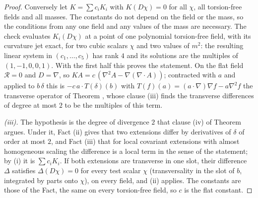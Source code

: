 \begin{proof}
Conversely let $K = \sum c_{i}K_{i}$ with $K(D\chi) = 0$ for all $\chi$, all torsion-free fields and all masses. The constants do not depend on the field or the mass, so the conditions from any one field and any values of the mass are necessary. The check evaluates $K_{i}(D\chi)$ at a point of one polynomial torsion-free field, with its curvature jet exact, for two cubic scalars $\chi$ and two values of $m^{2}$: the resulting linear system in $(c_{1}, \dots, c_{5})$ has rank $4$ and its solutions are the multiples of $(1, -1, 0, 0, 1)$. With the first half this proves the statement. On the flat field $\mathcal{R} = 0$ and $D = \nabla$, so $K A = c\,(\nabla^{2}A - \nabla(\nabla\cdot A))$; contracted with $a$ and applied to $b\,\delta$ this is $-c\,a\cdot T(\delta)(b)$ with $T(f)(a) = (a\cdot\nabla)\nabla f - a\nabla^{2}f$ the transverse operator of Theorem , whose clause (iii) finds the transverse differences of degree at most $2$ to be the multiples of this term.

\emph{(iii).} The hypothesis is the degree of divergence $2$ that clause (iv) of Theorem  argues. Under it, Fact (ii) gives that two extensions differ by derivatives of $\delta$ of order at most $2$, and Fact (iii) that for local covariant extensions with almost homogeneous scaling the difference is a local term in the sense of the statement; by (i) it is $\sum c_{i}K_{i}$. If both extensions are transverse in one slot, their difference $\Delta$ satisfies $\Delta(D\chi) = 0$ for every test scalar $\chi$ (transversality in the slot of $b$, integrated by parts onto $\chi$), on every field, and (ii) applies. The constants are those of the Fact, the same on every torsion-free field, so $c$ is the flat constant.


\end{proof}
